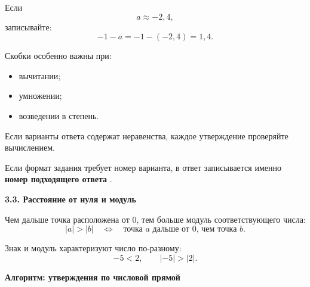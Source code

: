 \documentclass[a4paper,12pt]{article}
\newcommand{\subtopic}[1]{%
  \vspace{0.6em}
  {\large\bfseries\textcolor{darkaccent}{#1}}\par
  \vspace{0.15em}
}
\newcommand{\important}[1]{%
  \textbf{\textcolor{darkaccent}{#1}}%
}
\begin{document}
Если
\[
a\approx-2{,}4,
\]
записывайте:
\[
-1-a
=
-1-(-2{,}4)
=
1{,}4.
\]

Скобки особенно важны при:

\begin{itemize}
  \item вычитании;
  \item умножении;
  \item возведении в степень.
\end{itemize}

Если варианты ответа содержат неравенства,
каждое утверждение проверяйте вычислением.

Если формат задания требует номер варианта,
в ответ записывается именно
\important{номер подходящего ответа}.

\subtopic{3.3. Расстояние от нуля и модуль}

Чем дальше точка расположена от \(0\),
тем больше модуль соответствующего числа:
\[
|a|>|b|
\quad\Longleftrightarrow\quad
\text{точка }a\text{ дальше от }0
\text{, чем точка }b.
\]

Знак и модуль характеризуют число по-разному:
\[
-5<2,
\qquad
|-5|>|2|.
\]


\clearpage
\thispagestyle{plain}

\begin{center}
{\Large\bfseries
\textcolor{darkaccent}{Алгоритм: утверждения по числовой прямой}}
\end{center}

\vspace{0.2cm}
\end{document}
